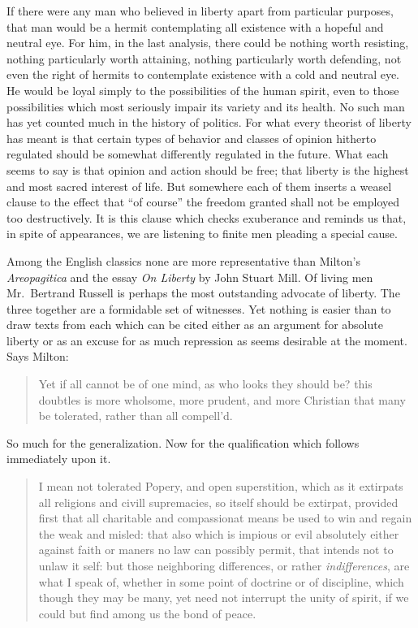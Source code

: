 \documentclass[openany,nobib,twoside,nohyper]{tufte-book}
\begin{document}
If there were any man who believed in liberty apart from particular
purposes, that man would be a hermit contemplating all existence with a
hopeful and neutral eye. For him, in the last analysis, there could be
nothing worth resisting, nothing particularly worth attaining, nothing
particularly worth defending, not even the right of hermits to
contemplate existence with a cold and neutral eye. He would be loyal
simply to the possibilities of the human spirit, even to those
possibilities which most seriously impair its variety and its health. No
such man has yet counted much in the history of politics. For what every
theorist of liberty has meant is that certain types of behavior and
classes of opinion hitherto regulated should be somewhat differently
regulated in the future. What each seems to say is that opinion and
action should be free; that liberty is the highest and most sacred
interest of life. But somewhere each of them inserts a weasel clause to
the effect that ``of course'' the freedom granted shall not be employed
too destructively. It is this clause which checks exuberance and reminds
us that, in spite of appearances, we are listening to finite men
pleading a special cause.

Among the English classics none are more representative than Milton's
\emph{Areopagitica} and the essay \emph{On Liberty} by John Stuart Mill.
Of living men Mr.~Bertrand Russell is perhaps the most outstanding
advocate of liberty. The three together are a formidable set of
witnesses. Yet nothing is easier than to draw texts from each which can
be cited either as an argument for absolute liberty or as an excuse for
as much repression as seems desirable at the moment. Says Milton:

\begin{quote}
Yet if all cannot be of one mind, as who looks they should be? this
doubtles is more wholsome, more prudent, and more Christian that many be
tolerated, rather than all compell'd.~
\end{quote}

So much for the generalization. Now for the qualification which follows
immediately upon it.

\begin{quote}
I mean not tolerated Popery, and open superstition, which as it
extirpats all religions and civill supremacies, so itself should be
extirpat, provided first that all charitable and compassionat means be
used to win and regain the weak and misled: that also which is impious
or evil absolutely either against faith or maners no law can possibly
permit, that intends not to unlaw it self: but those neighboring
differences, or rather \emph{indifferences}, are what I speak of,
whether in some point of doctrine or of discipline, which though they
may be many, yet need not interrupt the unity of spirit, if we could but
find among us the bond of peace.
\end{quote}
\end{document}
